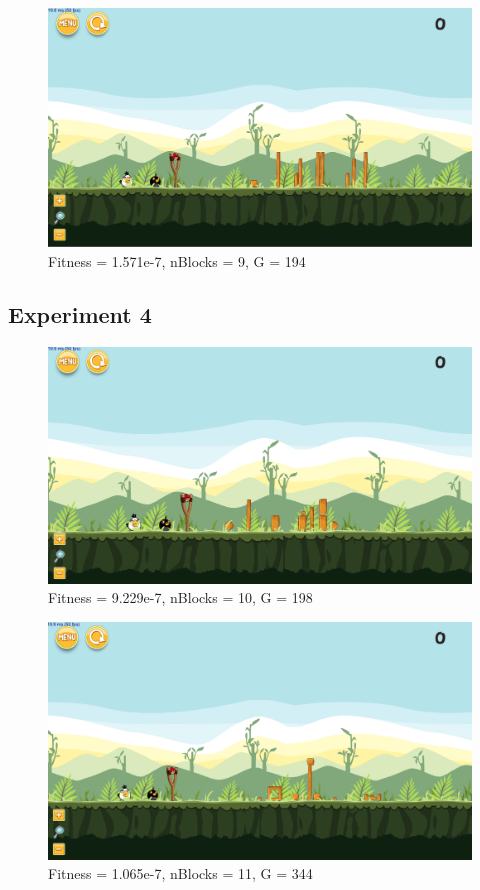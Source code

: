 \begin{figure}[H]
	\centering
	\includegraphics[scale=0.35]{gfx/e3/level-0-second_crossover180613_055622.png}
	\caption{Fitness = 1.571e-7, nBlocks = 9, G = 194  }\label{f:e3-4}
\end{figure}
\subsection{Experiment 4}\label{a:e4}

\begin{figure}[H]
	\centering
	\includegraphics[scale=0.35]{gfx/e4/level-0-second_crossover_min10_180602_035405.png}
	\caption{Fitness = 9.229e-7, nBlocks = 10, G = 198 }\label{f:e4-1}
\end{figure}

\begin{figure}[H]
	\centering
	\includegraphics[scale=0.35]{gfx/e4/level-0-second_crossover_min10_180603_040806.png}
	\caption{Fitness = 1.065e-7, nBlocks = 11, G = 344 }\label{f:e4-2}
\end{figure}

